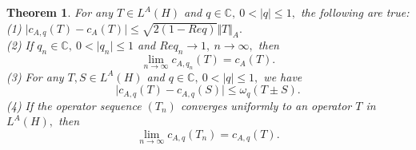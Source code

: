\documentclass[preprint,12pt,3p]{elsarticle}
\newtheorem{theorem}{Theorem}
\begin{document}
\begin{theorem}
\label{thm5}
For any $ T\in L^{A}(H) $ and $ q\in \mathbb{C}, \ 0<\vert q \vert\leq 1, $ the following are true: \\
(1) $ \vert c_{A,q}(T)-c_{A}(T)\vert\leq \sqrt{2(1-Req)}\Vert T \Vert_{A}. $ \\
(2) If $ q_{n}\in \mathbb{C}, \ 0<\vert q_{n} \vert \leq 1 $ and $ Re q_{n}\rightarrow 1, \ n\rightarrow \infty, $ then 
$$
\lim\limits_{n\rightarrow \infty}c_{A,q_{n}}(T)=c_{A}(T).
$$
(3) For any $ T,S\in L^{A}(H) $ and $ q\in \mathbb{C}, \ 0<\vert q \vert\leq 1, $ we have
$$ 
\vert c_{A,q}(T)-c_{A,q}(S)\vert\leq \omega_{q}(T\pm S).
$$
(4) If the operator sequence $ (T_{n})$ converges uniformly to an operator $ T $ in $ L^{A}(H), $ then
$$
\lim\limits_{n\rightarrow \infty}c_{A,q}(T_{n})=c_{A,q}(T).
$$
\end{theorem}
\end{document}
